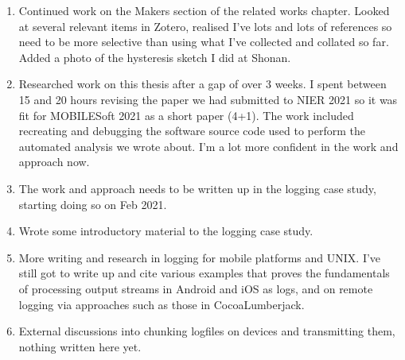 \begin{enumerate}
    \item Continued work on the Makers section of the related works chapter. Looked at several relevant items in Zotero, realised I've lots and lots of references so need to be more selective than using what I've collected and collated so far. Added a photo of the hysteresis sketch I did at Shonan.
    \item Researched work on this thesis after a gap of over 3 weeks. I spent between 15 and 20 hours revising the paper we had submitted to NIER 2021 so it was fit for MOBILESoft 2021 as a short paper (4+1). The work included recreating and debugging the software source code used to perform the automated analysis we wrote about. I'm a lot more confident in the work and approach now. 
    \item The work and approach needs to be written up in the logging case study, starting doing so on  Feb 2021.
    \item Wrote some introductory material to the logging case study.
    \item More writing and research in logging for mobile platforms and UNIX. I've still got to write up and cite various examples that proves the fundamentals of processing output streams in Android and iOS as logs, and on remote logging via approaches such as those in CocoaLumberjack.
    \item External discussions into chunking logfiles on devices and transmitting them, nothing written here yet.
\end{enumerate}
